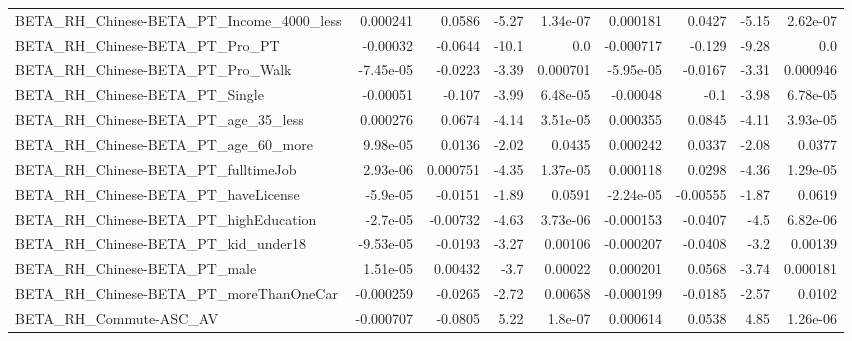 \begin{tabular}{lrrrrrrrr}
BETA\_RH\_Chinese-BETA\_PT\_Income\_4000\_less           &    0.000241 &       0.0586 &     -5.27 & 1.34e-07 &   0.000181 &      0.0427 &        -5.15 &      2.62e-07 \\
BETA\_RH\_Chinese-BETA\_PT\_Pro\_PT                     &    -0.00032 &      -0.0644 &     -10.1 &      0.0 &  -0.000717 &      -0.129 &        -9.28 &           0.0 \\
BETA\_RH\_Chinese-BETA\_PT\_Pro\_Walk                   &   -7.45e-05 &      -0.0223 &     -3.39 & 0.000701 &  -5.95e-05 &     -0.0167 &        -3.31 &      0.000946 \\
BETA\_RH\_Chinese-BETA\_PT\_Single                     &    -0.00051 &       -0.107 &     -3.99 & 6.48e-05 &   -0.00048 &        -0.1 &        -3.98 &      6.78e-05 \\
BETA\_RH\_Chinese-BETA\_PT\_age\_35\_less                &    0.000276 &       0.0674 &     -4.14 & 3.51e-05 &   0.000355 &      0.0845 &        -4.11 &      3.93e-05 \\
BETA\_RH\_Chinese-BETA\_PT\_age\_60\_more                &    9.98e-05 &       0.0136 &     -2.02 &   0.0435 &   0.000242 &      0.0337 &        -2.08 &        0.0377 \\
BETA\_RH\_Chinese-BETA\_PT\_fulltimeJob                &    2.93e-06 &     0.000751 &     -4.35 & 1.37e-05 &   0.000118 &      0.0298 &        -4.36 &      1.29e-05 \\
BETA\_RH\_Chinese-BETA\_PT\_haveLicense                &    -5.9e-05 &      -0.0151 &     -1.89 &   0.0591 &  -2.24e-05 &    -0.00555 &        -1.87 &        0.0619 \\
BETA\_RH\_Chinese-BETA\_PT\_highEducation              &    -2.7e-05 &     -0.00732 &     -4.63 & 3.73e-06 &  -0.000153 &     -0.0407 &         -4.5 &      6.82e-06 \\
BETA\_RH\_Chinese-BETA\_PT\_kid\_under18                &   -9.53e-05 &      -0.0193 &     -3.27 &  0.00106 &  -0.000207 &     -0.0408 &         -3.2 &       0.00139 \\
BETA\_RH\_Chinese-BETA\_PT\_male                       &    1.51e-05 &      0.00432 &      -3.7 &  0.00022 &   0.000201 &      0.0568 &        -3.74 &      0.000181 \\
BETA\_RH\_Chinese-BETA\_PT\_moreThanOneCar             &   -0.000259 &      -0.0265 &     -2.72 &  0.00658 &  -0.000199 &     -0.0185 &        -2.57 &        0.0102 \\
BETA\_RH\_Commute-ASC\_AV                             &   -0.000707 &      -0.0805 &      5.22 &  1.8e-07 &   0.000614 &      0.0538 &         4.85 &      1.26e-06 \\

\end{tabular}
